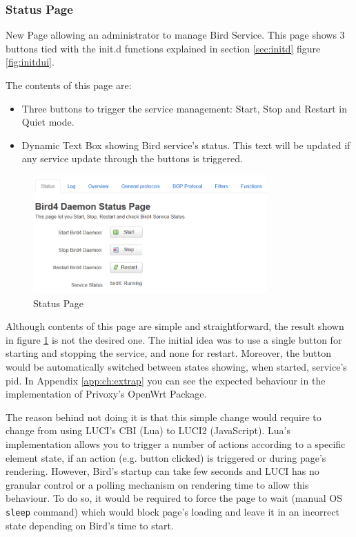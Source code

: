 \subsubsection{Status Page}
New Page allowing an administrator to manage Bird Service. This page shows 3 buttons tied with the init.d functions explained in section \ref{sec:initd} figure \ref{fig:initdui}.


The contents of this page are:
\begin{itemize}
    \item Three buttons to trigger the service management: Start, Stop and Restart in Quiet mode.
    \item Dynamic Text Box showing Bird service's status. This text will be updated if any service update through the buttons is triggered.
\end{itemize}

\begin{figure}[H]
    \centering
    \includegraphics[width=0.8\textwidth]{images/bird0.3/status}
    \caption{Status Page}
    \label{fig:statusp}
\end{figure}

Although contents of this page are simple and straightforward, the result shown in figure \ref{fig:statusp} is not the desired one. The initial idea was to use a single button for starting and stopping the service, and none for restart. Moreover, the button would be automatically switched between states showing, when started, service's \acrshort{pid}. In Appendix \ref{app:ch:extrap} you can see the expected behaviour in the implementation of Privoxy's OpenWrt Package.

The reason behind not doing it is that this simple change would require to change from using LUCI's CBI (Lua) to LUCI2 (JavaScript). Lua's implementation allows you to trigger a number of actions according to a specific element state, if an action (e.g. button clicked) is triggered or during page's rendering. However, Bird's startup can take few seconds and LUCI has no granular control or a polling mechanism on rendering time to allow this behaviour. To do so, it would be required to force the page to wait (manual OS \texttt{sleep} command) which would block page's loading and leave it in an incorrect state depending on Bird's time to start.

